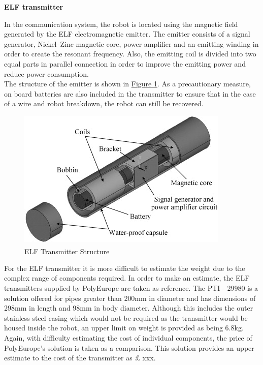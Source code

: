 \documentclass[11pt]{article}		%
\newlength{\imageheight}	 %
\newcommand{\supercite}[1]{\textsuperscript{\cite{#1}}}		%
\newcommand{\figref}[1]{\hyperref[#1]{Figure \ref*{#1}}}    %
\begin{document}
	        
	        \textbf{ELF transmitter}
	        
	        In the communication system, the robot is located using the magnetic field generated by the ELF electromagnetic emitter. 
	        The emitter consists of a signal generator, Nickel–Zinc magnetic core, power amplifier and an emitting winding in order to create the resonant frequency. 
	        Also, the emitting coil is divided into two equal parts in parallel connection in order to improve the emitting power and reduce power consumption. 
	        \\
	        \hspace*{3ex}The structure of the emitter is shown in \figref{ELFtransmitter}. 
	        As a precautionary measure, on board batteries are also included in the transmitter to ensure that in the case of a wire and robot breakdown, the robot can still be recovered.    
	        
	        \begin{figure}[h]
				\centering
				\includegraphics[height=\imageheight]{ELFtransmitter.jpg}
				\caption{ELF Transmitter Structure \supercite{ELFTransmitter}}
				\label{ELFtransmitter}
			\end{figure}
			
			For the ELF transmitter it is more difficult to estimate the weight due to the complex range of components required. In order to make an estimate, the ELF transmitters supplied by PolyEurope are taken as reference. The PTI - 29980 is a solution offered for pipes greater than 200mm in diameter and has dimensions of 298mm in length and 98mm in body diameter. Although this includes the outer stainless steel casing which would not be required as the transmitter would be housed inside the robot, an upper limit on weight is provided as being 6.8kg.\\
		    \hspace*{3ex}Again, with difficulty estimating the cost of individual components, the price of PolyEurope’s solution is taken as a comparison. This solution provides an upper estimate to the cost of the transmitter as £ xxx. 
			
\end{document}
